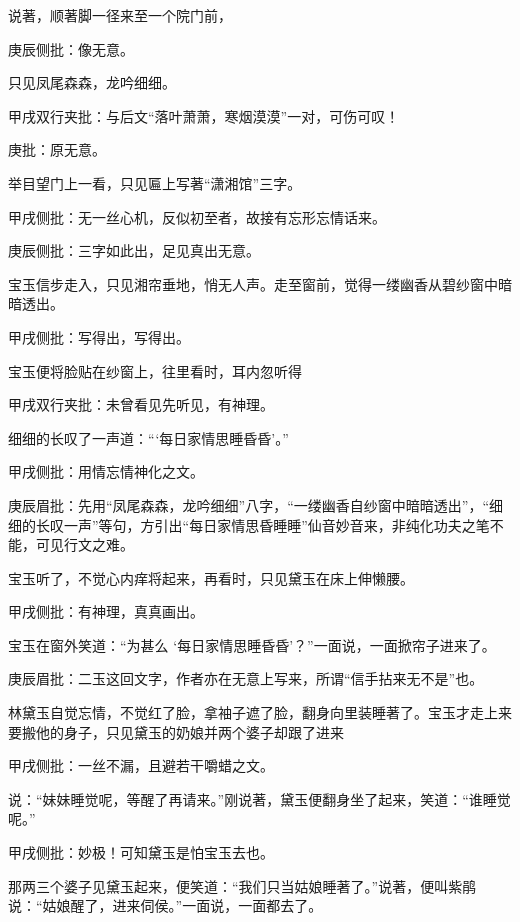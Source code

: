 \begin{parag}


    说著，顺著脚一径来至一个院门前，\begin{note}庚辰侧批：像无意。\end{note}只见凤尾森森，龙吟细细。\begin{note}甲戌双行夹批：与后文“落叶萧萧，寒烟漠漠”一对，可伤可叹！\end{note}\begin{note}庚批：原无意。\end{note}举目望门上一看，只见匾上写著“潇湘馆”三字。\begin{note}甲戌侧批：无一丝心机，反似初至者，故接有忘形忘情话来。\end{note}\begin{note}庚辰侧批：三字如此出，足见真出无意。\end{note}宝玉信步走入，只见湘帘垂地，悄无人声。走至窗前，觉得一缕幽香从碧纱窗中暗暗透出。\begin{note}甲戌侧批：写得出，写得出。\end{note}宝玉便将脸贴在纱窗上，往里看时，耳内忽听得\begin{note}甲戌双行夹批：未曾看见先听见，有神理。\end{note}细细的长叹了一声道：“‘每日家情思睡昏昏’。”\begin{note}甲戌侧批：用情忘情神化之文。\end{note}\begin{note}庚辰眉批：先用“凤尾森森，龙吟细细”八字，“一缕幽香自纱窗中暗暗透出”，“细细的长叹一声”等句，方引出“每日家情思昏睡睡”仙音妙音来，非纯化功夫之笔不能，可见行文之难。\end{note}宝玉听了，不觉心内痒将起来，再看时，只见黛玉在床上伸懒腰。\begin{note}甲戌侧批：有神理，真真画出。\end{note}宝玉在窗外笑道：“为甚么 ‘每日家情思睡昏昏’？”一面说，一面掀帘子进来了。\begin{note}庚辰眉批：二玉这回文字，作者亦在无意上写来，所谓“信手拈来无不是”也。\end{note}
\end{parag}


\begin{parag}


    林黛玉自觉忘情，不觉红了脸，拿袖子遮了脸，翻身向里装睡著了。宝玉才走上来要搬他的身子，只见黛玉的奶娘并两个婆子却跟了进来\begin{note}甲戌侧批：一丝不漏，且避若干嚼蜡之文。\end{note}说：“妹妹睡觉呢，等醒了再请来。”刚说著，黛玉便翻身坐了起来，笑道：“谁睡觉呢。”\begin{note}甲戌侧批：妙极！可知黛玉是怕宝玉去也。\end{note}那两三个婆子见黛玉起来，便笑道：“我们只当姑娘睡著了。”说著，便叫紫鹃说：“姑娘醒了，进来伺侯。”一面说，一面都去了。
\end{parag}


